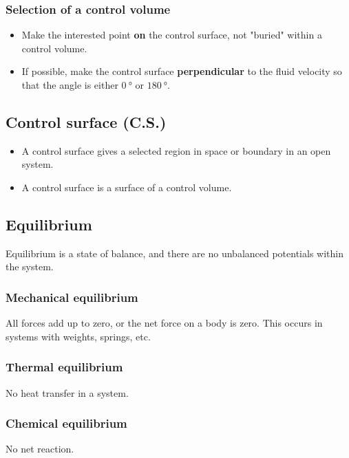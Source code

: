 \documentclass[11pt]{article}
\begin{document}
\subsubsection{Selection of a control volume}
\label{sec:org61fc7fd}
\begin{itemize}
\item Make the interested point \textbf{on} the control surface, not "buried" within a control volume.
\item If possible, make the control surface \textbf{perpendicular} to the fluid velocity so that the angle is either \(\qty{0}{\degree}\) or \(\qty{180}{\degree}\).
\end{itemize}

\subsection{Control surface (C.S.)}
\label{sec:orgdacb0e7}
\begin{itemize}
\item A control surface gives a selected region in space or boundary in an open system.
\item A control surface is a surface of a control volume.
\end{itemize}

\subsection{Equilibrium}
\label{sec:org52f004d}
Equilibrium is a state of balance, and there are no unbalanced potentials within the system.

\subsubsection{Mechanical equilibrium}
\label{sec:org13f21c1}
All forces add up to zero, or the net force on a body is zero. This occurs in systems with weights, springs, etc.

\subsubsection{Thermal equilibrium}
\label{sec:orgf0ebbf9}
No heat transfer in a system.

\subsubsection{Chemical equilibrium}
\label{sec:orgff66774}
No net reaction.
\end{document}
